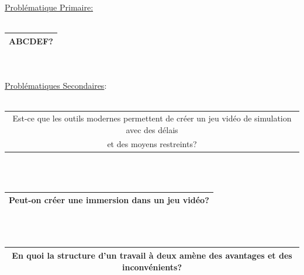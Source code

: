 \documentclass{article}
\begin{document}
        \begin{center}
            \underline{Problématique Primaire:}\\

                {\textcolor{white}{.}} \\
                
                \begin{tabular}{|c|} \hline
                    {\Large\textbf{ABCDEF?}} \\ \hline
                \end{tabular} \\

                {\textcolor{white}{.}} \\

            \underline{Problématiques Secondaires}:\\
            
                {\textcolor{white}{.}} \\
                
                \begin{tabular}{|c|} \hline
                    Est-ce que les outils modernes permettent de créer un jeu vidéo de simulation avec des délais \\et des moyens restreints? \\ \hline
                \end{tabular} \\
                
                {\textcolor{white}{.}} \\
                
                \begin{tabular}{|c|} \hline
                    Peut-on créer une immersion dans un jeu vidéo? \\ \hline
                \end{tabular} \\

                {\textcolor{white}{.}} \\

                \begin{tabular}{|c|} \hline
                    En quoi la structure d'un travail à deux amène des avantages et des inconvénients? \\ \hline
                \end{tabular}\\
            
        \end{center}
        
\end{document}
